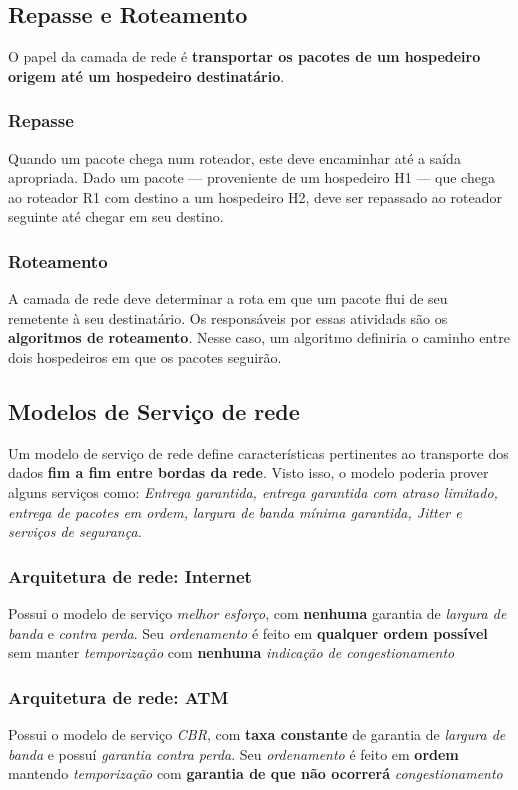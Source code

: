 \documentclass[a4paper, 12pt]{article}
\begin{document}
\subsection{Repasse e Roteamento}
O papel da camada de rede é \textbf{ transportar os pacotes de um hospedeiro origem até um hospedeiro destinatário}.

    \subsubsection{Repasse}
        Quando um pacote chega num roteador, este deve encaminhar até a saída apropriada.
        Dado um pacote — proveniente de um hospedeiro H1 — que chega ao roteador R1 com destino a um hospedeiro H2, deve ser 
        repassado ao roteador seguinte até chegar em seu destino.

    \subsubsection{Roteamento}
        A camada de rede deve determinar a rota em que um pacote flui de seu remetente à seu destinatário. Os responsáveis por essas
        atividads são os \textbf{algoritmos de roteamento}. Nesse caso, um algoritmo definiria o caminho entre dois hospedeiros em que
        os pacotes seguirão.

\subsection{Modelos de Serviço de rede}

Um modelo de serviço de rede define características pertinentes ao transporte dos dados \textbf{ fim a fim entre bordas da rede}.
Visto isso, o modelo poderia prover alguns serviços como: \textit{Entrega garantida, entrega garantida com atraso limitado, 
entrega de pacotes em ordem, largura de banda mínima garantida, Jitter e serviços de segurança.}

    \subsubsection{Arquitetura de rede: Internet}
    Possui o modelo de serviço \textit{melhor esforço}, com \textbf{nenhuma} garantia de \textit{largura de banda} e \textit{contra perda}.
    Seu \textit{ordenamento} é feito em \textbf{qualquer ordem possível} sem manter \textit{temporização} com \textbf{nenhuma} 
    \textit{indicação de congestionamento}

    \subsubsection{Arquitetura de rede: ATM}
    Possui o modelo de serviço \textit{CBR}, com \textbf{taxa constante} de garantia de \textit{largura de banda} e possuí 
    \textit{garantia contra perda}.
    Seu \textit{ordenamento} é feito em \textbf{ordem} mantendo \textit{temporização} com \textbf{garantia de que não ocorrerá} 
    \textit{congestionamento}
\end{document}

